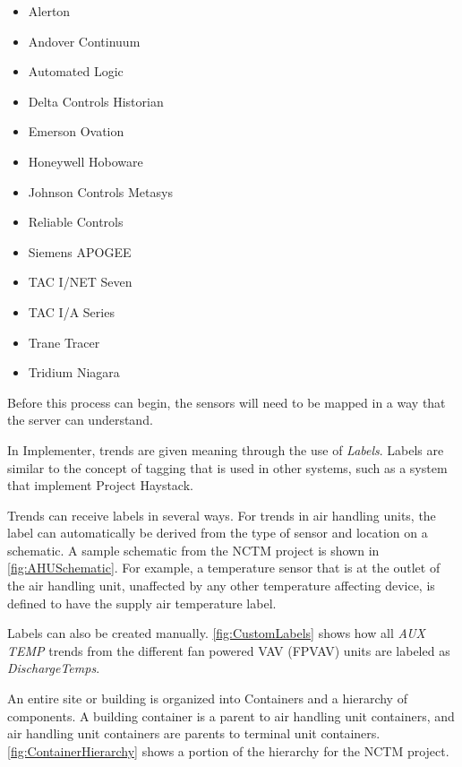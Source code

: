 \begin{itemize}
    \item Alerton
    \item Andover Continuum
    \item Automated Logic
    \item Delta Controls Historian
    \item Emerson Ovation
    \item Honeywell Hoboware
    \item Johnson Controls Metasys
    \item Reliable Controls
    \item Siemens APOGEE
    \item TAC I/NET Seven
    \item TAC I/A Series
    \item Trane Tracer
    \item Tridium Niagara 
\end{itemize}

Before this process can begin, the sensors will need to be mapped in a
way that the server can understand. 

In Implementer, trends are given meaning through the use of
\textit{Labels}. Labels are similar to the concept of tagging that is used
in other systems, such as a system that implement Project Haystack. 

Trends can receive labels in several ways. For trends in air handling
units, the label can automatically be derived from the type of sensor and
location on a schematic. A sample schematic from the NCTM project is
shown in \figref{} \ref{fig:AHUSchematic}. For example, a temperature
sensor that is at the outlet of the air handling unit, unaffected by any
other temperature affecting device, is defined to have the supply air
temperature label. 

Labels can also be created manually. \figref{} \ref{fig:CustomLabels}
shows how all \textit{AUX TEMP} trends from the different fan powered
VAV (FPVAV) units are labeled as \textit{DischargeTemps}.

An entire site or building is organized into Containers and a
hierarchy of components. A building container is a parent to air
handling unit containers, and air handling unit containers are parents
to terminal unit containers. \figref{} \ref{fig:ContainerHierarchy}
shows a portion of the hierarchy for the NCTM project.

